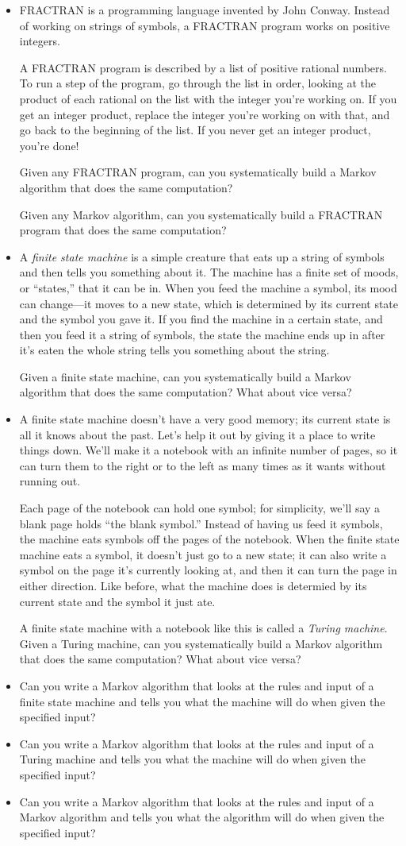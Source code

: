 \documentclass{article}
\newcommand*\proveit{\item[\manimpossiblecube]}
\begin{document}
\begin{itemize}
\proveit FRACTRAN is a programming language invented by John Conway. Instead of working on strings of symbols, a FRACTRAN program works on positive integers.

A FRACTRAN program is described by a list of positive rational numbers. To run a step of the program, go through the list in order, looking at the product of each rational on the list with the integer you're working on. If you get an integer product, replace the integer you're working on with that, and go back to the beginning of the list. If you never get an integer product, you're done!

Given any FRACTRAN program, can you systematically build a Markov algorithm that does the same computation?

Given any Markov algorithm, can you systematically build a FRACTRAN program that does the same computation?
\proveit
A {\em finite state machine} is a simple creature that eats up a string of symbols and then tells you something about it. The machine has a finite set of moods, or ``states,'' that it can be in. When you feed the machine a symbol, its mood can change---it moves to a new state, which is determined by its current state and the symbol you gave it. If you find the machine in a certain state, and then you feed it a string of symbols, the state the machine ends up in after it's eaten the whole string tells you something about the string.

Given a finite state machine, can you systematically build a Markov algorithm that does the same computation? What about vice versa?
\proveit
A finite state machine doesn't have a very good memory; its current state is all it knows about the past. Let's help it out by giving it a place to write things down. We'll make it a notebook with an infinite number of pages, so it can turn them to the right or to the left as many times as it wants without running out.

Each page of the notebook can hold one symbol; for simplicity, we'll say a blank page holds ``the blank symbol.'' Instead of having us feed it symbols, the machine eats symbols off the pages of the notebook. When the finite state machine eats a symbol, it doesn't just go to a new state; it can also write a symbol on the page it's currently looking at, and then it can turn the page in either direction. Like before, what the machine does is determied by its current state and the symbol it just ate.

A finite state machine with a notebook like this is called a {\em Turing machine}. Given a Turing machine, can you systematically build a Markov algorithm that does the same computation? What about vice versa?
\proveit Can you write a Markov algorithm that looks at the rules and input of a finite state machine and tells you what the machine will do when given the specified input?
\proveit Can you write a Markov algorithm that looks at the rules and input of a Turing machine and tells you what the machine will do when given the specified input?
\proveit Can you write a Markov algorithm that looks at the rules and input of a Markov algorithm and tells you what the algorithm will do when given the specified input?
\end{itemize}
\end{document}
